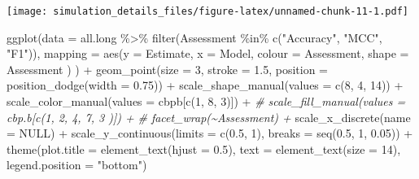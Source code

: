 \documentclass[
]{article}
\newenvironment{Shaded}{\begin{snugshade}}{\end{snugshade}}
\newcommand{\AttributeTok}[1]{\textcolor[rgb]{0.77,0.63,0.00}{#1}}
\newcommand{\CommentTok}[1]{\textcolor[rgb]{0.56,0.35,0.01}{\textit{#1}}}
\newcommand{\ConstantTok}[1]{\textcolor[rgb]{0.00,0.00,0.00}{#1}}
\newcommand{\DecValTok}[1]{\textcolor[rgb]{0.00,0.00,0.81}{#1}}
\newcommand{\FloatTok}[1]{\textcolor[rgb]{0.00,0.00,0.81}{#1}}
\newcommand{\FunctionTok}[1]{\textcolor[rgb]{0.00,0.00,0.00}{#1}}
\newcommand{\NormalTok}[1]{#1}
\newcommand{\SpecialCharTok}[1]{\textcolor[rgb]{0.00,0.00,0.00}{#1}}
\newcommand{\StringTok}[1]{\textcolor[rgb]{0.31,0.60,0.02}{#1}}
\begin{document}
\texttt{[image: simulation\_details\_files/figure-latex/unnamed-chunk-11-1.pdf]}

\begin{Shaded}
\begin{Highlighting}[]
\FunctionTok{ggplot}\NormalTok{(}\AttributeTok{data =}\NormalTok{ all.long }\SpecialCharTok{\%\textgreater{}\%} 
         \FunctionTok{filter}\NormalTok{(Assessment }\SpecialCharTok{\%in\%} \FunctionTok{c}\NormalTok{(}\StringTok{"Accuracy"}\NormalTok{, }\StringTok{"MCC"}\NormalTok{, }\StringTok{"F1"}\NormalTok{)),}
       \AttributeTok{mapping =} \FunctionTok{aes}\NormalTok{(}\AttributeTok{y =}\NormalTok{ Estimate,}
                     \AttributeTok{x =}\NormalTok{ Model, }
                     \AttributeTok{colour =}\NormalTok{ Assessment,}
                     \AttributeTok{shape =}\NormalTok{ Assessment}
\NormalTok{                     )}
\NormalTok{       ) }\SpecialCharTok{+}
  \FunctionTok{geom\_point}\NormalTok{(}\AttributeTok{size =} \DecValTok{3}\NormalTok{, }\AttributeTok{stroke =} \FloatTok{1.5}\NormalTok{,}
             \AttributeTok{position =} \FunctionTok{position\_dodge}\NormalTok{(}\AttributeTok{width =} \FloatTok{0.75}\NormalTok{)) }\SpecialCharTok{+}
  \FunctionTok{scale\_shape\_manual}\NormalTok{(}\AttributeTok{values =} \FunctionTok{c}\NormalTok{(}\DecValTok{8}\NormalTok{, }\DecValTok{4}\NormalTok{, }\DecValTok{14}\NormalTok{)) }\SpecialCharTok{+}
  \FunctionTok{scale\_color\_manual}\NormalTok{(}\AttributeTok{values =}\NormalTok{ cbpb[}\FunctionTok{c}\NormalTok{(}\DecValTok{1}\NormalTok{, }\DecValTok{8}\NormalTok{, }\DecValTok{3}\NormalTok{)]) }\SpecialCharTok{+}
  \CommentTok{\# scale\_fill\_manual(values = cbp.b[c(1, 2, 4, 7, 3 )]) +}
  \CommentTok{\# facet\_wrap(\textasciitilde{}Assessment) +}
  \FunctionTok{scale\_x\_discrete}\NormalTok{(}\AttributeTok{name =} \ConstantTok{NULL}\NormalTok{) }\SpecialCharTok{+}
  \FunctionTok{scale\_y\_continuous}\NormalTok{(}\AttributeTok{limits =} \FunctionTok{c}\NormalTok{(}\FloatTok{0.5}\NormalTok{, }\DecValTok{1}\NormalTok{),}
                     \AttributeTok{breaks =} \FunctionTok{seq}\NormalTok{(}\FloatTok{0.5}\NormalTok{, }\DecValTok{1}\NormalTok{, }\FloatTok{0.05}\NormalTok{)) }\SpecialCharTok{+}
  \FunctionTok{theme}\NormalTok{(}\AttributeTok{plot.title =} \FunctionTok{element\_text}\NormalTok{(}\AttributeTok{hjust =} \FloatTok{0.5}\NormalTok{), }
        \AttributeTok{text =} \FunctionTok{element\_text}\NormalTok{(}\AttributeTok{size =} \DecValTok{14}\NormalTok{),}
        \AttributeTok{legend.position =} \StringTok{"bottom"}\NormalTok{)}
\end{Highlighting}
\end{Shaded}
\end{document}
